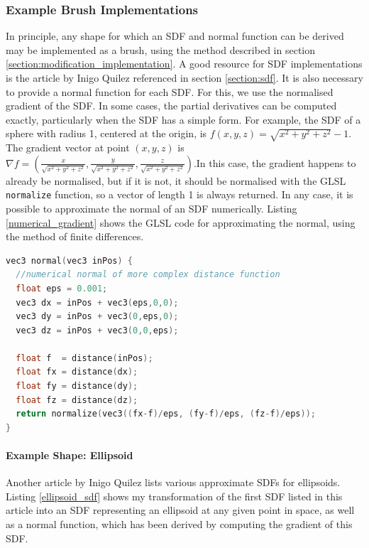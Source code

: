 \documentclass{article}
\begin{document}
\subsubsection{Example Brush Implementations}
In principle, any shape for which an SDF and normal function can be derived may be implemented as a brush, using the method described in section \ref{section:modification_implementation}. A good resource for SDF implementations is the article by Inigo Quilez referenced in section \ref{section:sdf}\cite{quilez:sdf}. It is also necessary to provide a normal function for each SDF. For this, we use the normalised gradient of the SDF. In some cases, the partial derivatives can be computed exactly, particularly when the SDF has a simple form. For example, the SDF of a sphere with radius 1, centered at the origin, is $f\left(x,y,z\right) = \sqrt{x^2+y^2+z^2}-1$. The gradient vector at point $\left(x,y,z\right)$ is $\nabla f = \left(\frac{x}{\sqrt{x^2+y^2+z^2}},\frac{y}{\sqrt{x^2+y^2+z^2}},\frac{z}{\sqrt{x^2+y^2+z^2}}\right)$.In this case, the gradient happens to already be normalised, but if it is not, it should be normalised with the GLSL \texttt{normalize} function, so a vector of length 1 is always returned. In any case, it is possible to approximate the normal of an SDF numerically. Listing \ref{numerical_gradient} shows the GLSL code for approximating the normal, using the method of finite differences.

\begin{lstlisting}[language=C++,label={numerical_gradient},caption={Approximation of the normal of an SDF. Note however, that this requires 4 evaluations of the SDF. The constant \texttt{eps} can be adjusted for precision as required.}]
vec3 normal(vec3 inPos) {
  //numerical normal of more complex distance function
  float eps = 0.001;
  vec3 dx = inPos + vec3(eps,0,0);
  vec3 dy = inPos + vec3(0,eps,0);
  vec3 dz = inPos + vec3(0,0,eps);

  float f  = distance(inPos);
  float fx = distance(dx);
  float fy = distance(dy);
  float fz = distance(dz);
  return normalize(vec3((fx-f)/eps, (fy-f)/eps, (fz-f)/eps));
}
\end{lstlisting}

\paragraph{Example Shape: Ellipsoid}
Another article by Inigo Quilez\cite{quilez:ellipsoid} lists various approximate SDFs for ellipsoids. Listing \ref{ellipsoid_sdf} shows my transformation of the first SDF listed in this article into an SDF representing an ellipsoid at any given point in space, as well as a normal function, which has been derived by computing the gradient of this SDF.
\end{document}
